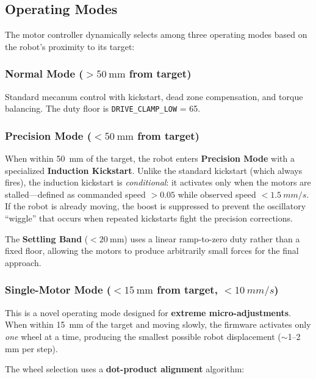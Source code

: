 \documentclass[12pt, a4paper, twoside]{article}
\begin{document}
\subsection{Operating Modes}

The motor controller dynamically selects among three operating modes based on the robot's proximity to its target:

\subsubsection{Normal Mode ($> \SI{50}{\milli\metre}$ from target)}

Standard mecanum control with kickstart, dead zone compensation, and torque balancing. The duty floor is \texttt{DRIVE\_CLAMP\_LOW} = 65.

\subsubsection{Precision Mode ($< \SI{50}{\milli\metre}$ from target)}
\label{sec:precision}

When within \SI{50}{\milli\metre} of the target, the robot enters \textbf{Precision Mode} with a specialized \textbf{Induction Kickstart}. Unlike the standard kickstart (which always fires), the induction kickstart is \emph{conditional}: it activates only when the motors are stalled---defined as commanded speed $> 0.05$ while observed speed $< \SI{1.5}{mm/s}$. If the robot is already moving, the boost is suppressed to prevent the oscillatory ``wiggle'' that occurs when repeated kickstarts fight the precision corrections.

The \textbf{Settling Band} ($< \SI{20}{\milli\metre}$) uses a linear ramp-to-zero duty rather than a fixed floor, allowing the motors to produce arbitrarily small forces for the final approach.

\subsubsection{Single-Motor Mode ($< \SI{15}{\milli\metre}$ from target, $< \SI{10}{mm/s}$)}
\label{sec:single-motor}

This is a novel operating mode designed for \textbf{extreme micro-adjustments}. When within \SI{15}{\milli\metre} of the target and moving slowly, the firmware activates only \emph{one} wheel at a time, producing the smallest possible robot displacement ({$\sim$1--2\,mm} per step).

The wheel selection uses a \textbf{dot-product alignment} algorithm:
\end{document}
